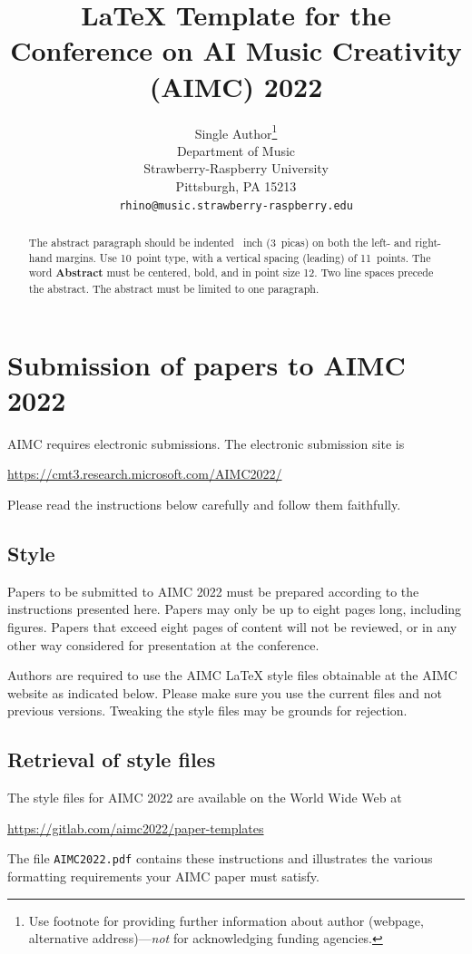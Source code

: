 \documentclass{article}
\title{\LaTeX{} Template for the Conference on AI Music Creativity (AIMC) 2022}
\author{%
  Single Author\thanks{Use footnote for providing further information
    about author (webpage, alternative address)---\emph{not} for acknowledging
    funding agencies.} \\
  Department of Music\\
  Strawberry-Raspberry University\\
  Pittsburgh, PA 15213 \\
  \texttt{rhino@music.strawberry-raspberry.edu} \\
}
\begin{document}
\maketitle

\begin{abstract}
  The abstract paragraph should be indented ~inch (3~picas) on
  both the left- and right-hand margins. Use 10~point type, with a vertical
  spacing (leading) of 11~points.  The word \textbf{Abstract} must be centered,
  bold, and in point size 12. Two line spaces precede the abstract. The abstract
  must be limited to one paragraph.
\end{abstract}

\section{Submission of papers to AIMC 2022}

AIMC requires electronic submissions.  The electronic submission site is
\begin{center}
  \url{https://cmt3.research.microsoft.com/AIMC2022/}
\end{center}

Please read the instructions below carefully and follow them faithfully.

\subsection{Style}

Papers to be submitted to AIMC 2022 must be prepared according to the
instructions presented here. Papers may only be up to eight pages long, including figures. Papers that exceed eight pages of content will not be reviewed, or in any other way considered for
presentation at the conference.

Authors are required to use the AIMC \LaTeX{} style files obtainable at the
AIMC website as indicated below. Please make sure you use the current files
and not previous versions. Tweaking the style files may be grounds for
rejection.

\subsection{Retrieval of style files}

The style files for AIMC 2022 are available on
the World Wide Web at
\begin{center}
  \url{https://gitlab.com/aimc2022/paper-templates}
\end{center}
The file \verb+AIMC2022.pdf+ contains these instructions and illustrates the
various formatting requirements your AIMC paper must satisfy.
\end{document}
